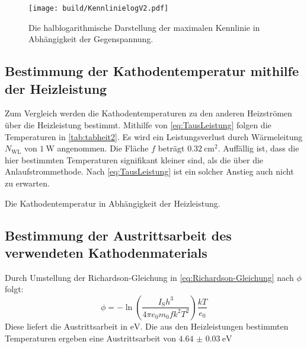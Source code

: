  \begin{figure}
  \centering
  \caption{Die halblogarithmische Darstellung der maximalen Kennlinie in Abhängigkeit der Gegenspannung.}
  \texttt{[image: build/KennlinielogV2.pdf]}
  \label{fig:Graphlog3}
 \end{figure}

\subsection{Bestimmung der Kathodentemperatur mithilfe der Heizleistung}
Zum Vergleich werden die Kathodentemperaturen zu den anderen Heizströmen über die Heizleistung bestimmt.
Mithilfe von \ref{eq:TausLeistung} folgen die Temperaturen in \ref{tab:tabheit2}. Es wird ein Leistungsverlust durch Wärmeleitung $N_\text{WL}$ von $\SI{1}{\watt}$ angenommen.
Die Fläche $f$ beträgt $\SI{0.32}{\centi\meter\squared}$.
Auffällig ist, dass die hier bestimmten Temperaturen signifikant kleiner sind,
als die über die Anlaufstrommethode. Nach \ref{eq:TausLeistung} ist ein solcher Anstieg auch nicht zu erwarten.

\begin{table}
 \centering
 \caption{Die Kathodentemperatur in Abhängigkeit der Heizleistung.}
 
 \label{tab:tabheit2}
\end{table}

\subsection{Bestimmung der Austrittsarbeit des verwendeten Kathodenmaterials}
Durch Umstellung der Richardson-Gleichung in \ref{eq:Richardson-Gleichung} nach
$\phi$ folgt:
\begin{equation}
  \phi = -\ln\left(\frac{I_\text{S} h^3}{4\pi e_0 m_0 f k^2 T^2}\right) \frac{k T}{e_0}
\end{equation}
Diese liefert die Austrittsarbeit in $\si{\electronvolt}$. Die aus den Heizleistungen
bestimmten Temperaturen ergeben eine Austrittsarbeit von $\SI{4.64(3)}{\electronvolt}$
